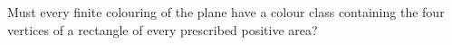 Must every finite colouring of the plane have a colour class containing the four vertices of a rectangle of every prescribed positive area?
